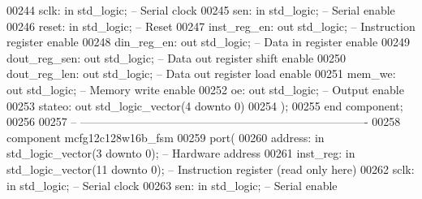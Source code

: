 \begin{DoxyCode}
00244         sclk: \textcolor{keywordflow}{in} \textcolor{comment}{std\_logic};             \textcolor{keyword}{-- Serial clock}
00245         sen: \textcolor{keywordflow}{in} \textcolor{comment}{std\_logic};              \textcolor{keyword}{-- Serial enable}
00246         reset: \textcolor{keywordflow}{in} \textcolor{comment}{std\_logic};                \textcolor{keyword}{-- Reset}
00247         inst\_reg\_en: \textcolor{keywordflow}{out} \textcolor{comment}{std\_logic};         \textcolor{keyword}{-- Instruction register enable}
00248         din\_reg\_en: \textcolor{keywordflow}{out} \textcolor{comment}{std\_logic};          \textcolor{keyword}{-- Data in register enable}
00249         dout\_reg\_sen: \textcolor{keywordflow}{out} \textcolor{comment}{std\_logic};            \textcolor{keyword}{-- Data out register shift enable}
00250         dout\_reg\_len: \textcolor{keywordflow}{out} \textcolor{comment}{std\_logic};            \textcolor{keyword}{-- Data out register load enable}
00251         mem\_we: \textcolor{keywordflow}{out} \textcolor{comment}{std\_logic};              \textcolor{keyword}{-- Memory write enable}
00252         oe: \textcolor{keywordflow}{out} \textcolor{comment}{std\_logic};              \textcolor{keyword}{-- Output enable}
00253         stateo: \textcolor{keywordflow}{out} \textcolor{comment}{std\_logic\_vector}(\textcolor{vhdllogic}{}\textcolor{vhdllogic}{4} \textcolor{keywordflow}{downto} \textcolor{vhdllogic}{}\textcolor{vhdllogic}{0})
00254     );
00255 \textcolor{keywordflow}{end} \textcolor{keywordflow}{component};
00256 
00257 \textcolor{keyword}{-- ----------------------------------------------------------------------------}
00258 \textcolor{keywordflow}{component} mcfg12c128w16b\_fsm
00259     \textcolor{keywordflow}{port}(
00260         address: \textcolor{keywordflow}{in} \textcolor{comment}{std\_logic\_vector}(\textcolor{vhdllogic}{}\textcolor{vhdllogic}{3} \textcolor{keywordflow}{downto} \textcolor{vhdllogic}{}\textcolor{vhdllogic}{0});   \textcolor{keyword}{-- Hardware address}
00261         inst\_reg: \textcolor{keywordflow}{in} \textcolor{comment}{std\_logic\_vector}(\textcolor{vhdllogic}{}\textcolor{vhdllogic}{11} \textcolor{keywordflow}{downto} \textcolor{vhdllogic}{}\textcolor{vhdllogic}{0}); \textcolor{keyword}{-- Instruction register (read only here)}
00262         sclk: \textcolor{keywordflow}{in} \textcolor{comment}{std\_logic};             \textcolor{keyword}{-- Serial clock}
00263         sen: \textcolor{keywordflow}{in} \textcolor{comment}{std\_logic};              \textcolor{keyword}{-- Serial enable}

\end{DoxyCode}
